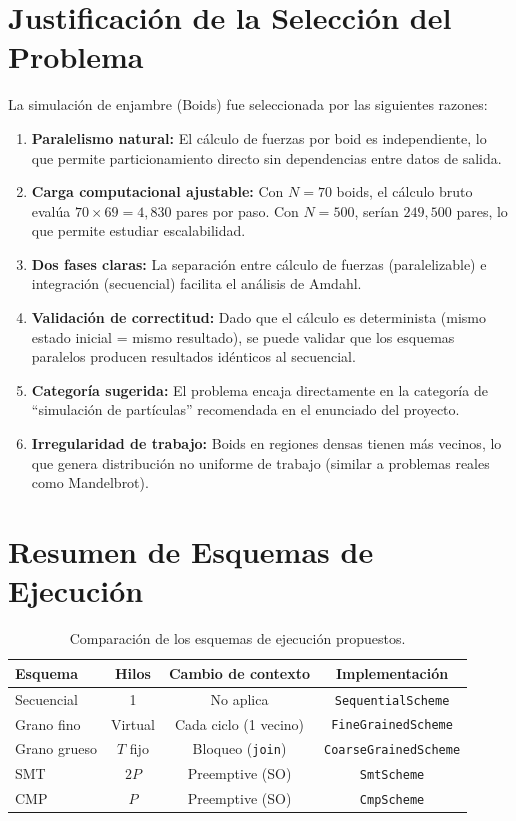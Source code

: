 \documentclass[11pt,a4paper]{article}
\begin{document}
\section{Justificación de la Selección del Problema}
\label{sec:justificacion}

La simulación de enjambre (Boids) fue seleccionada por las siguientes razones:

\begin{enumerate}
  \item \textbf{Paralelismo natural:} El cálculo de fuerzas por boid es independiente, lo que permite particionamiento directo sin dependencias entre datos de salida.
  \item \textbf{Carga computacional ajustable:} Con $N = 70$ boids, el cálculo bruto evalúa $70 \times 69 = 4{,}830$ pares por paso. Con $N = 500$, serían $249{,}500$ pares, lo que permite estudiar escalabilidad.
  \item \textbf{Dos fases claras:} La separación entre cálculo de fuerzas (paralelizable) e integración (secuencial) facilita el análisis de Amdahl.
  \item \textbf{Validación de correctitud:} Dado que el cálculo es determinista (mismo estado inicial = mismo resultado), se puede validar que los esquemas paralelos producen resultados idénticos al secuencial.
  \item \textbf{Categoría sugerida:} El problema encaja directamente en la categoría de ``simulación de partículas'' recomendada en el enunciado del proyecto.
  \item \textbf{Irregularidad de trabajo:} Boids en regiones densas tienen más vecinos, lo que genera distribución no uniforme de trabajo (similar a problemas reales como Mandelbrot).
\end{enumerate}

\section{Resumen de Esquemas de Ejecución}

\begin{table}[h]
\centering
\caption{Comparación de los esquemas de ejecución propuestos.}
\label{tab:esquemas}
\begin{tabular}{@{}lccc@{}}
\toprule
\textbf{Esquema} & \textbf{Hilos} & \textbf{Cambio de contexto} & \textbf{Implementación} \\
\midrule
Secuencial & 1 & No aplica & \texttt{SequentialScheme} \\
Grano fino & Virtual & Cada ciclo (1 vecino) & \texttt{FineGrainedScheme} \\
Grano grueso & $T$ fijo & Bloqueo (\texttt{join}) & \texttt{CoarseGrainedScheme} \\
SMT & $2P$ & Preemptive (SO) & \texttt{SmtScheme} \\
CMP & $P$ & Preemptive (SO) & \texttt{CmpScheme} \\
\bottomrule
\end{tabular}
\end{table}
\end{document}
